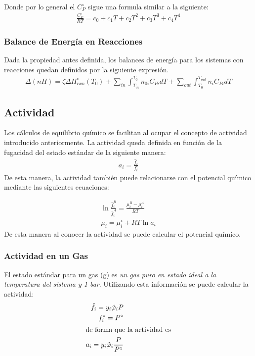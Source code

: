 Donde por lo general el $C_P^\circ$ sigue una formula similar a la siguiente:
\begin{align}
    \frac{C_P^\circ}{RT}=c_0+c_1T+c_2T^2+c_3T^3+c_4T^4
\end{align}

\subsubsection{Balance de Energía en Reacciones}

Dada la propiedad antes definida, los balances de energía para los sistemas con reacciones quedan definidos por la siguiente expresión.
\begin{align}
    \Delta(\dot{n}H)=\zeta \Delta H_{rxn}^\circ (T_0)+\sum_{in}\int_{T_{in}}^{T_0}n_{0i}C_{Pi}dT+\sum_{out}\int_{T_0}^{T_{out}}n_i C_{Pi}dT
\end{align}

\subsection{Actividad}
Los cálculos de equilibrio químico se facilitan al ocupar el concepto de actividad introducido anteriormente. La actividad queda definida en función de la fugacidad del estado estándar de la siguiente manera:
\begin{align}
    a_i=\frac{\hat{f}_i}{f_i^\circ}
\end{align}
De esta manera, la actividad también puede relacionarse con el potencial químico mediante las siguientes ecuaciones:

\begin{align}
    \ln \frac{\hat{f}^B_i}{\hat{f}^A_i}=\frac{\mu_i^B-\mu_i^A}{RT}\\
    \mu_i=\mu_i^\circ+RT\ln a_i
\end{align}
De esta manera al conocer la actividad se puede calcular el potencial químico.

\subsubsection{Actividad en un Gas}

El estado estándar para un gas (g) es \textit{un gas puro en estado ideal a la temperatura del sistema y 1 bar}. Utilizando esta información se puede calcular la actividad:
\begin{align}
    \hat{f}_i=y_i\hat{\varphi}_iP\\
    f_i^\circ = P^\circ\\
    \intertext{de forma que la actividad es}
    a_i=y_i \hat{\varphi}_i\frac{P}{P^\circ}
\end{align}

